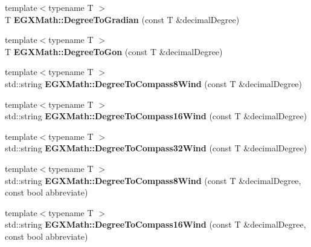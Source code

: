 \begin{DoxyCompactItemize}
\item 
\mbox{\label{group___angle_conversions_ga25bb5506b3f66fff7a1b85bf7bd795b3}} 
{\footnotesize template$<$typename T $>$ }\\T {\bfseries E\+G\+X\+Math\+::\+Degree\+To\+Gradian} (const T \&decimal\+Degree)
\item 
\mbox{\label{group___angle_conversions_ga87c3fab0867021e5d2501197b4db6194}} 
{\footnotesize template$<$typename T $>$ }\\T {\bfseries E\+G\+X\+Math\+::\+Degree\+To\+Gon} (const T \&decimal\+Degree)
\item 
\mbox{\label{group___angle_conversions_ga2931d1a465a38eeac2bff28be7bd1cdc}} 
{\footnotesize template$<$typename T $>$ }\\std\+::string {\bfseries E\+G\+X\+Math\+::\+Degree\+To\+Compass8\+Wind} (const T \&decimal\+Degree)
\item 
\mbox{\label{group___angle_conversions_gae18a97e6d8ca3cd39150ceeb70a7dd37}} 
{\footnotesize template$<$typename T $>$ }\\std\+::string {\bfseries E\+G\+X\+Math\+::\+Degree\+To\+Compass16\+Wind} (const T \&decimal\+Degree)
\item 
\mbox{\label{group___angle_conversions_gae1d23b2ed99cb9c274ffcc350d6ff6ce}} 
{\footnotesize template$<$typename T $>$ }\\std\+::string {\bfseries E\+G\+X\+Math\+::\+Degree\+To\+Compass32\+Wind} (const T \&decimal\+Degree)
\item 
\mbox{\label{group___angle_conversions_gaf7f66c4acc53575c51646ffe28159930}} 
{\footnotesize template$<$typename T $>$ }\\std\+::string {\bfseries E\+G\+X\+Math\+::\+Degree\+To\+Compass8\+Wind} (const T \&decimal\+Degree, const bool abbreviate)
\item 
\mbox{\label{group___angle_conversions_ga426e45c519f51eda3b0707077899b396}} 
{\footnotesize template$<$typename T $>$ }\\std\+::string {\bfseries E\+G\+X\+Math\+::\+Degree\+To\+Compass16\+Wind} (const T \&decimal\+Degree, const bool abbreviate)

\end{DoxyCompactItemize}
